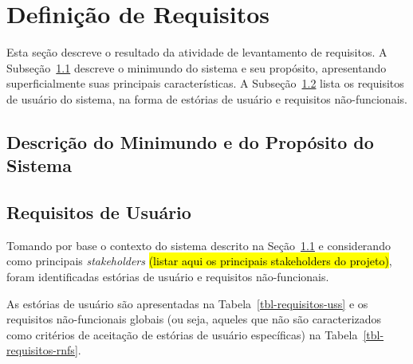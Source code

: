 \chapter{Definição de Requisitos}
\label{sec-requisitos}
\vspace{-1cm}

Esta seção descreve o resultado da atividade de levantamento de requisitos.
A Subseção~\ref{sec-requisitos-minimundo} descreve o minimundo do sistema e seu propósito, apresentando superficialmente suas principais características. 
A Subseção~\ref{sec-requisitos-usuario} lista os requisitos de usuário do sistema, na forma de estórias de usuário e requisitos não-funcionais. 




\section{Descrição do Minimundo e do Propósito do Sistema}
\label{sec-requisitos-minimundo}




\section{Requisitos de Usuário}
\label{sec-requisitos-usuario}


Tomando por base o contexto do sistema descrito na Seção~\ref{sec-requisitos-minimundo} e considerando como principais \textit{stakeholders} \hl{(listar aqui os principais stakeholders do projeto)}, foram identificadas estórias de usuário e requisitos não-funcionais.

As estórias de usuário são apresentadas na Tabela~\ref{tbl-requisitos-uss} e os requisitos não-funcionais globais (ou seja, aqueles que não são caracterizados como critérios de aceitação de estórias de usuário específicas) na Tabela~\ref{tbl-requisitos-rnfs}.

